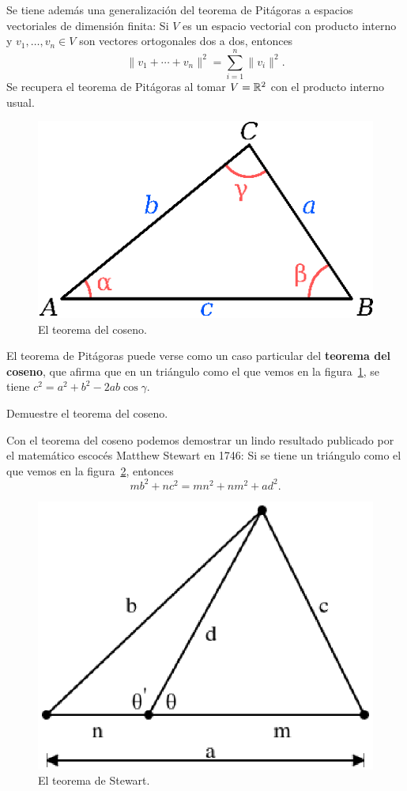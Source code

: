 Se tiene
además una generalización del teorema de Pitágoras a espacios vectoriales de
dimensión finita: Si $V$ es un espacio vectorial con producto interno y
$v_1,\dots,v_n\in V$ son vectores ortogonales dos a dos, entonces 
\[
	\|v_1+\cdots+v_n\|^2=\sum_{i=1}^n \|v_i\|^2.
\]
Se recupera el teorema de Pitágoras al tomar $V=\mathbb{R}^2$ con el producto interno
usual.

\begin{figure}[h]
	\centering
	\includegraphics[scale=.5]{images/coseno}
	\caption{El teorema del coseno.}
	\label{fig:coseno}
\end{figure}

El teorema de Pitágoras puede verse como un caso particular del \textbf{teorema
del coseno}, que afirma que en un triángulo como el que vemos en la
figura~\ref{fig:coseno}, se tiene $c^2=a^2+b^2-2ab\cos\gamma$.

\begin{exercise}
	Demuestre el teorema del coseno.
\end{exercise}

Con el teorema del coseno podemos demostrar un lindo resultado publicado por el
matemático escocés Matthew Stewart en 1746: Si se tiene un triángulo como el
que vemos en la figura~\ref{fig:Stewart}, entonces
\[
	mb^2+nc^2=mn^2+nm^2+ad^2.
\]

\begin{figure}[h]
	\centering
	\includegraphics[scale=.4]{images/stewart}
	\caption{El teorema de Stewart.}
	\label{fig:Stewart}
\end{figure}

